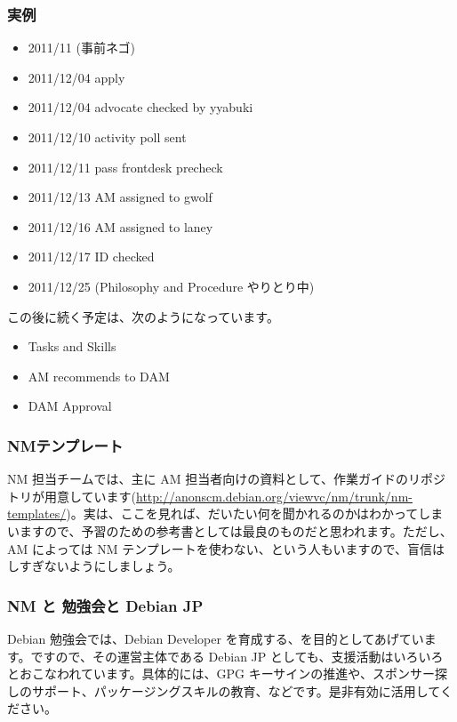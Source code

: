 \documentclass[mingoth,a4paper]{jsarticle}
\begin{document}
\subsubsection{実例}

\begin{itemize}
\item 2011/11 (事前ネゴ)
\item 2011/12/04 apply
\item 2011/12/04 advocate checked by yyabuki
\item 2011/12/10 activity poll sent
\item 2011/12/11 pass frontdesk precheck
\item 2011/12/13 AM assigned to gwolf
\item 2011/12/16 AM assigned to laney
\item 2011/12/17 ID checked
\item 2011/12/25 (Philosophy and Procedure やりとり中)
\end{itemize}

この後に続く予定は、次のようになっています。

\begin{itemize}
\item Tasks and Skills
\item AM recommends to DAM
\item DAM Approval
\end{itemize}

\subsubsection{NMテンプレート}

NM 担当チームでは、主に AM 担当者向けの資料として、作業ガイドのリポジトリが用意しています(\url{http://anonscm.debian.org/viewvc/nm/trunk/nm-templates/})。実は、ここを見れば、だいたい何を聞かれるのかはわかってしまいますので、予習のための参考書としては最良のものだと思われます。ただし、AM によっては NM テンプレートを使わない、という人もいますので、盲信はしすぎないようにしましょう。

\subsubsection{NM と 勉強会と Debian JP}

Debian 勉強会では、Debian Developer を育成する、を目的としてあげています。ですので、その運営主体である Debian JP としても、支援活動はいろいろとおこなわれています。具体的には、GPG キーサインの推進や、スポンサー探しのサポート、パッケージングスキルの教育、などです。是非有効に活用してください。
\end{document}
